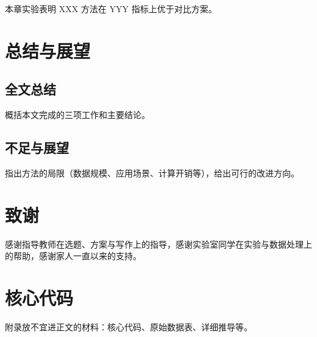 \documentclass[UTF8,a4paper,zihao=-4,fontset=\swfontset,openany]{ctexbook}
\begin{document}
本章实验表明 XXX 方法在 YYY 指标上优于对比方案。

\chapter{总结与展望}
\label{chap:conclusion}

\section{全文总结}

概括本文完成的三项工作和主要结论。

\section{不足与展望}

指出方法的局限（数据规模、应用场景、计算开销等），给出可行的改进方向。




\chapter*{致\quad 谢}

感谢指导教师在选题、方案与写作上的指导，感谢实验室同学在实验与数据处理上的帮助，感谢家人一直以来的支持。

\appendix
{}
\chapter{核心代码}
\label{app:code}

附录放不宜进正文的材料：核心代码、原始数据表、详细推导等。
\end{document}
